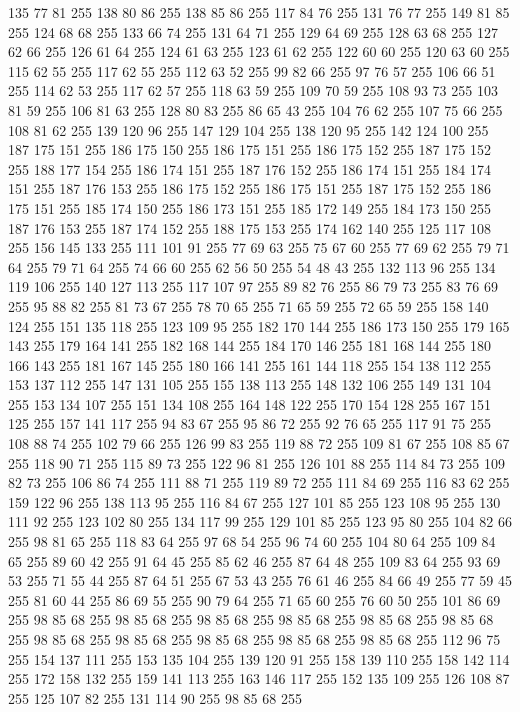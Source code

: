 135 77 81 255 138 80 86 255 138 85 86 255 117 84 76 255 131 76 77 255 149 81 85 255 124 68 68 255 133 66 74 255 131 64 71 255 129 64 69 255 128 63 68 255 127 62 66 255 126 61 64 255 124 61 63 255 123 61 62 255 122 60 60 255 120 63 60 255 115 62 55 255 117 62 55 255 112 63 52 255 99 82 66 255 97 76 57 255 106 66 51 255 114 62 53 255 117 62 57 255 118 63 59 255 109 70 59 255 108 93 73 255 103 81 59 255 106 81 63 255 128 80 83 255 86 65 43 255 104 76 62 255 107 75 66 255 108 81 62 255 139 120 96 255 147 129 104 255 138 120 95 255 142 124 100 255 187 175 151 255 186 175 150 255 186 175 151 255 186 175 152 255 187 175 152 255 188 177 154 255 186 174 151 255 187 176 152 255 186 174 151 255 184 174 151 255 187 176 153 255 186 175 152 255 186 175 151 255 187 175 152 255 186 175 151 255 185 174 150 255 186 173 151 255 185 172 149 255 184 173 150 255 187 176 153 255 187 174 152 255 188 175 153 255 174 162 140 255 125 117 108 255 156 145 133 255
111 101 91 255 77 69 63 255 75 67 60 255 77 69 62 255 79 71 64 255 79 71 64 255 74 66 60 255 62 56 50 255 54 48 43 255 132 113 96 255 134 119 106 255 140 127 113 255 117 107 97 255 89 82 76 255 86 79 73 255 83 76 69 255 95 88 82 255 81 73 67 255 78 70 65 255 71 65 59 255 72 65 59 255 158 140 124 255 151 135 118 255 123 109 95 255 182 170 144 255 186 173 150 255 179 165 143 255 179 164 141 255 182 168 144 255 184 170 146 255 181 168 144 255 180 166 143 255 181 167 145 255 180 166 141 255 161 144 118 255 154 138 112 255 153 137 112 255 147 131 105 255 155 138 113 255 148 132 106 255 149 131 104 255 153 134 107 255 151 134 108 255 164 148 122 255 170 154 128 255 167 151 125 255 157 141 117 255 94 83 67 255 95 86 72 255 92 76 65 255 117 91 75 255 108 88 74 255 102 79 66 255 126 99 83 255 119 88 72 255 109 81 67 255 108 85 67 255 118 90 71 255 115 89 73 255 122 96 81 255 126 101 88 255 114 84 73 255 109 82 73 255 106 86 74 255
111 88 71 255 119 89 72 255 111 84 69 255 116 83 62 255 159 122 96 255 138 113 95 255 116 84 67 255 127 101 85 255 123 108 95 255 130 111 92 255 123 102 80 255 134 117 99 255 129 101 85 255 123 95 80 255 104 82 66 255 98 81 65 255 118 83 64 255 97 68 54 255 96 74 60 255 104 80 64 255 109 84 65 255 89 60 42 255 91 64 45 255 85 62 46 255 87 64 48 255 109 83 64 255 93 69 53 255 71 55 44 255 87 64 51 255 67 53 43 255 76 61 46 255 84 66 49 255 77 59 45 255 81 60 44 255 86 69 55 255 90 79 64 255 71 65 60 255 76 60 50 255 101 86 69 255 98 85 68 255 98 85 68 255 98 85 68 255 98 85 68 255 98 85 68 255 98 85 68 255 98 85 68 255 98 85 68 255 98 85 68 255 98 85 68 255 98 85 68 255 112 96 75 255 154 137 111 255 153 135 104 255 139 120 91 255 158 139 110 255 158 142 114 255 172 158 132 255 159 141 113 255 163 146 117 255 152 135 109 255 126 108 87 255 125 107 82 255 131 114 90 255 98 85 68 255
